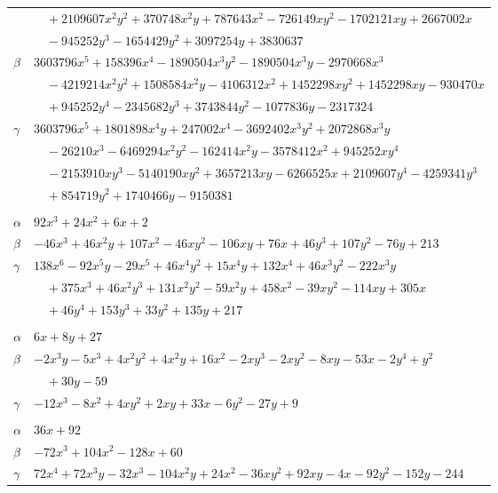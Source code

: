 \documentclass[11pt]{article}
\begin{document}
\begin{longtable}{@{}ll@{}}
 & $\quad +2109607x^{2}y^{2}+370748x^{2}y+787643x^{2}-726149xy^{2}-1702121xy+2667002x$\\
 & $\quad -945252y^{3}-1654429y^{2}+3097254y+3830637$\\
$\beta$ & $3603796x^{5}+158396x^{4}-1890504x^{3}y^{2}-1890504x^{3}y-2970668x^{3}$\\
 & $\quad -4219214x^{2}y^{2}+1508584x^{2}y-4106312x^{2}+1452298xy^{2}+1452298xy-930470x$\\
 & $\quad +945252y^{4}-2345682y^{3}+3743844y^{2}-1077836y-2317324$\\
$\gamma$ & $3603796x^{5}+1801898x^{4}y+247002x^{4}-3692402x^{3}y^{2}+2072868x^{3}y$\\
 & $\quad -26210x^{3}-6469294x^{2}y^{2}-162414x^{2}y-3578412x^{2}+945252xy^{4}$\\
 & $\quad -2153910xy^{3}-5140190xy^{2}+3657213xy-6266525x+2109607y^{4}-4259341y^{3}$\\
 & $\quad +854719y^{2}+1740466y-9150381$\\
\addlinespace[3pt]
\multicolumn{2}{@{}l}{$\{i,j\}=\{80,211\}$, $k_{ij}=2$}\\
$\alpha$ & $92x^{3}+24x^{2}+6x+2$\\
$\beta$ & $-46x^{3}+46x^{2}y+107x^{2}-46xy^{2}-106xy+76x+46y^{3}+107y^{2}-76y+213$\\
$\gamma$ & $138x^{6}-92x^{5}y-29x^{5}+46x^{4}y^{2}+15x^{4}y+132x^{4}+46x^{3}y^{2}-222x^{3}y$\\
 & $\quad +375x^{3}+46x^{2}y^{3}+131x^{2}y^{2}-59x^{2}y+458x^{2}-39xy^{2}-114xy+305x$\\
 & $\quad +46y^{4}+153y^{3}+33y^{2}+135y+217$\\
\addlinespace[3pt]
\multicolumn{2}{@{}l}{$\{i,j\}=\{82,83\}$, $k_{ij}=7^{2}$}\\
$\alpha$ & $6x+8y+27$\\
$\beta$ & $-2x^{3}y-5x^{3}+4x^{2}y^{2}+4x^{2}y+16x^{2}-2xy^{3}-2xy^{2}-8xy-53x-2y^{4}+y^{2}$\\
 & $\quad +30y-59$\\
$\gamma$ & $-12x^{3}-8x^{2}+4xy^{2}+2xy+33x-6y^{2}-27y+9$\\
\addlinespace[3pt]
\multicolumn{2}{@{}l}{$\{i,j\}=\{83,102\}$, $k_{ij}=2^{2}\cdot 5^{2}\cdot 7$}\\
$\alpha$ & $36x+92$\\
$\beta$ & $-72x^{3}+104x^{2}-128x+60$\\
$\gamma$ & $72x^{4}+72x^{3}y-32x^{3}-104x^{2}y+24x^{2}-36xy^{2}+92xy-4x-92y^{2}-152y-244$\\

\end{longtable}
\end{document}
